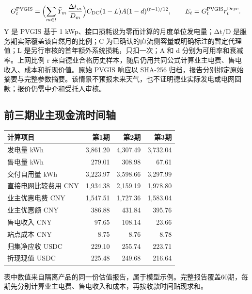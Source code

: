 \documentclass[12pt,a4paper]{article}
\begin{document}
\[G_t^{\mathrm{PVGIS}}=\Bigl(\sum_{m\in t}\bar Y_m\,\frac{\Delta t_m}{D_m}\Bigr)C_{\rm DC}(1-L)A(1-d)^{(t-1)/12},\qquad E_t=G_t^{\mathrm{PVGIS}}r_t^{\rm Deye}.\]
Y 是 PVGIS 基于 1 kWp、接口损耗设为零而计算的月度单位发电量；Δt/D 是服务期实际覆盖该自然月的比例；C 为已确认的直流侧容量或明确标注的暂定代理值；L 是另行审核的首年额外系统损耗，只扣一次；A 和 d 分别为可用率和衰减率。上网比例 r 来自德业合格历史样本，随后仍用共同公式计算业主电费、售电收入、成本和折现价值。原始 PVGIS 响应以 SHA-256 归档，报告分别绑定原始摘要与完整参数摘要。该情景不预报未来天气，也不证明德业实际发电或电网回款；报价仍需中介和受托人审核。

\clearpage\begin{landscape}
\subsection{前三期业主现金流时间轴}
\begin{center}\end{center}\begin{center}\begin{tabular}{L{10cm}rrr}\toprule 计算项目 & 第1期 & 第2期 & 第3期\\\midrule
发电量 kWh & 3,861.20 & 4,307.49 & 3,732.04\\
售电量 kWh & 279.01 & 308.98 & 67.61\\
交付自用量 kWh & 3,223.97 & 3,598.66 & 3,297.99\\
直接电网比较费用 CNY & 1,934.38 & 2,159.19 & 1,978.80\\
业主优惠电费 CNY & 1,547.51 & 1,727.36 & 1,583.04\\
业主优惠额 CNY & 386.88 & 431.84 & 395.76\\
售电收入 CNY & 97.65 & 108.14 & 23.66\\
站点成本 CNY & 8.75 & 8.76 & 8.78\\
归集净应收 USDC & 229.10 & 255.74 & 223.71\\
折现现值 USDC & 225.48 & 249.68 & 216.64\\
\bottomrule\end{tabular}\end{center}
表中数值来自隔离产品的同一份估值报告，属于模型示例。完整报告覆盖60期，每期先分别计算业主电费、售电收入和成本，再按收款时间贴现求和。

\end{landscape}
\end{document}
